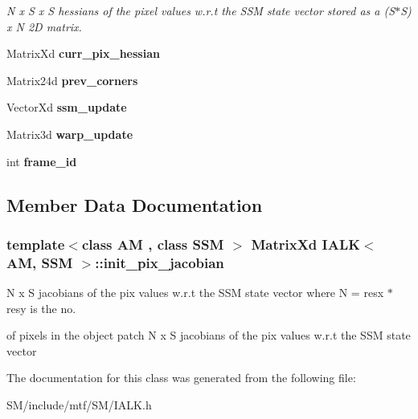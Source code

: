 \begin{DoxyCompactItemize}
\begin{DoxyCompactList}\small\item\em N x S x S hessians of the pixel values w.\-r.\-t the S\-S\-M state vector stored as a (S$\ast$\-S) x N 2\-D matrix. \end{DoxyCompactList}\item 
\hypertarget{classIALK_a06943e47f54e36699fe80500dc0ab7d4}{Matrix\-Xd {\bfseries curr\-\_\-pix\-\_\-hessian}}\label{classIALK_a06943e47f54e36699fe80500dc0ab7d4}

\item 
\hypertarget{classIALK_a52e12fae87d02868a0f4bb0e4782e8f1}{Matrix24d {\bfseries prev\-\_\-corners}}\label{classIALK_a52e12fae87d02868a0f4bb0e4782e8f1}

\item 
\hypertarget{classIALK_a962943fb279254d91cda28296183f556}{Vector\-Xd {\bfseries ssm\-\_\-update}}\label{classIALK_a962943fb279254d91cda28296183f556}

\item 
\hypertarget{classIALK_a06bd9af1aa0ee4a3f364e4377dbf30f9}{Matrix3d {\bfseries warp\-\_\-update}}\label{classIALK_a06bd9af1aa0ee4a3f364e4377dbf30f9}

\item 
\hypertarget{classIALK_a62a8292024fd92a6edf95109c75235d0}{int {\bfseries frame\-\_\-id}}\label{classIALK_a62a8292024fd92a6edf95109c75235d0}

\end{DoxyCompactItemize}


\subsection{Member Data Documentation}
\hypertarget{classIALK_a56a3ab9d611d6f87029491b5d9da8a7d}{
\subsubsection[{init\-\_\-pix\-\_\-jacobian}]{\setlength{\rightskip}{0pt plus 5cm}template$<$class A\-M , class S\-S\-M $>$ Matrix\-Xd {\bf I\-A\-L\-K}$<$ A\-M, S\-S\-M $>$\-::init\-\_\-pix\-\_\-jacobian\hspace{0.3cm}{\ttfamily [protected]}}}\label{classIALK_a56a3ab9d611d6f87029491b5d9da8a7d}


N x S jacobians of the pix values w.\-r.\-t the S\-S\-M state vector where N = resx $\ast$ resy is the no. 

of pixels in the object patch N x S jacobians of the pix values w.\-r.\-t the S\-S\-M state vector 

The documentation for this class was generated from the following file\-:\begin{DoxyCompactItemize}
\item 
S\-M/include/mtf/\-S\-M/I\-A\-L\-K.\-h\end{DoxyCompactItemize}
